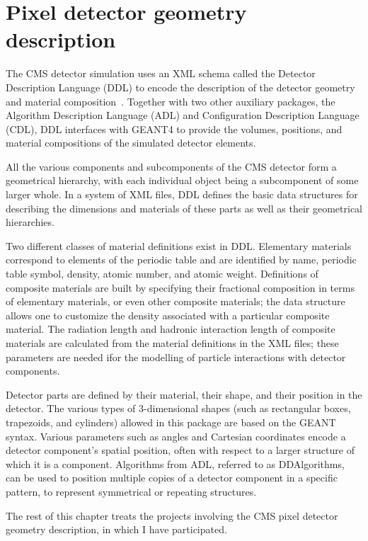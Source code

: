 \chapter{Pixel detector geometry description\label{sec:matbudg}}

The CMS detector simulation uses an XML schema called the Detector Description Language (DDL) to encode the description of the detector geometry and material composition~\cite{CMS_AN_2005-000}. Together with two other auxiliary packages, the Algorithm Description Language (ADL) and Configuration Description Language (CDL), DDL interfaces with GEANT4 to provide the volumes, positions, and material compositions of the simulated detector elements.

All the various components and subcomponents of the CMS detector form a geometrical hierarchy, with each individual object being a subcomponent of some larger whole. In a system of XML files, DDL defines the basic data structures for describing the dimensions and materials of these parts as well as their geometrical hierarchies.

Two different classes of material definitions exist in DDL. Elementary materials correspond to elements of the periodic table and are identified by name, periodic table symbol, density, atomic number, and atomic weight. Definitions of composite materials are built by specifying their fractional composition in terms of elementary materials, or even other composite materials; the data structure allows one to customize the density associated with a particular composite material. The radiation length and hadronic interaction length of composite materials are calculated from the material definitions in the XML files; these parameters are needed ifor the modelling of particle interactions with detector components.

Detector parts are defined by their material, their shape, and their position in the detector. The various types of 3-dimensional shapes (such as rectangular boxes, trapezoids, and cylinders) allowed in this package are based on the GEANT syntax. Various parameters such as angles and Cartesian coordinates encode a detector component's spatial position, often with respect to a larger structure of which it is a component. Algorithms from ADL, referred to as DDAlgorithms, can be used to position multiple copies of a detector component in a specific pattern, to represent symmetrical or repeating structures.

The rest of this chapter treats the projects involving the CMS pixel detector geometry description, in which I have participated.

